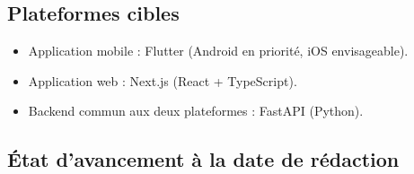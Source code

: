 \documentclass[11pt,a4paper]{article}
\begin{document}
\subsection{Plateformes cibles}
\begin{itemize}[leftmargin=*]
    \item Application mobile : Flutter (Android en priorité, iOS envisageable).
    \item Application web : Next.js (React + TypeScript).
    \item Backend commun aux deux plateformes : FastAPI (Python).
\end{itemize}

\subsection{État d'avancement à la date de rédaction}
\end{document}
